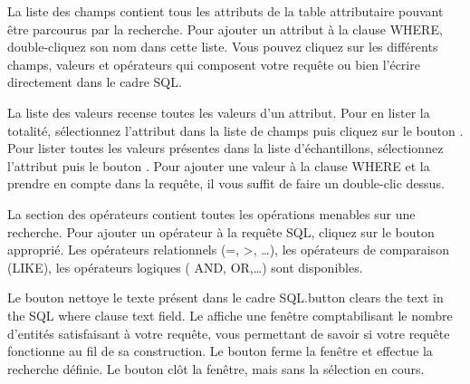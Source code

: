 La liste des champs contient tous les attributs de la table attributaire pouvant être parcourus par la recherche. Pour ajouter un attribut à la clause WHERE, double-cliquez son nom dans cette liste. Vous pouvez cliquez sur les différents champs, valeurs et opérateurs qui composent votre requête ou bien l'écrire directement dans le cadre SQL.

La liste des valeurs recense toutes les valeurs d'un attribut. Pour en lister la totalité, sélectionnez l'attribut dans la liste de champs puis cliquez sur le bouton . Pour lister toutes les valeurs présentes dans la liste d'échantillons, sélectionnez l'attribut puis le bouton . Pour ajouter une valeur à la clause WHERE et la prendre en compte dans la requête, il vous suffit de faire un double-clic dessus.

La section des opérateurs contient toutes les opérations menables sur une recherche. Pour ajouter un opérateur à la requête SQL, cliquez sur le bouton approprié. Les opérateurs relationnels (=, >, \dots), les opérateurs de comparaison (LIKE), les opérateurs logiques ( AND, OR,\dots) sont disponibles.

Le bouton  nettoye le texte présent dans le cadre SQL.button clears the text in the SQL where clause text field. Le  affiche une fenêtre comptabilisant le nombre d'entités satisfaisant à votre requête, vous permettant de savoir si votre requête fonctionne au fil de sa construction. Le bouton  ferme la fenêtre et effectue la recherche définie. Le bouton  clôt la fenêtre, mais sans la sélection en cours.

